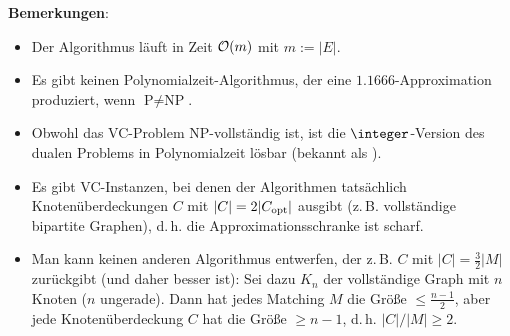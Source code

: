 \linie

\textbf{Bemerkungen}:
\begin{itemize}
    \item
    Der Algorithmus läuft in Zeit $\mathcal{O}(m)$ mit $m := |E|$.
    
    \item
    Es gibt keinen Polynomialzeit-Algorithmus, der eine $1.1666$-Approximation produziert,
    wenn $\text{P} \not= \text{NP}$.
    
    \item
    Obwohl das VC-Problem NP-vollständig ist, ist die $\integer$-Version des dualen Problems
    in Polynomialzeit lösbar (bekannt als ).
    
    \item
    Es gibt VC-Instanzen, bei denen der Algorithmen tatsächlich Knotenüberdeckungen $C$
    mit $|C| = 2|C_{\text{opt}}|$ ausgibt
    (z.\,B. vollständige bipartite Graphen),
    d.\,h. die Approximationsschranke ist scharf.
    
    \item
    Man kann keinen anderen Algorithmus entwerfen, der z.\,B. $C$ mit
    $|C| = \frac{3}{2} |M|$ zurückgibt (und daher besser ist):
    Sei dazu $K_n$ der vollständige Graph mit $n$ Knoten ($n$ ungerade).
    Dann hat jedes Matching $M$ die Größe $\le \frac{n-1}{2}$,
    aber jede Knotenüberdeckung $C$ hat die Größe $\ge n - 1$,
    d.\,h. $|C|/|M| \ge 2$.
\end{itemize}

\pagebreak
